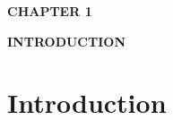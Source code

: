 \documentclass[12pt,a4paper,twoside]{report}
\begin{document}


\tableofcontents


\listoffigures


\listoftables





\clearpage
\thispagestyle{empty}

\begin{center}
    \vspace*{\fill}

    {\fontsize{16}{19}\selectfont\bfseries CHAPTER 1\par}
    \vspace{0.6cm}
    {\fontsize{16}{19}\selectfont\bfseries INTRODUCTION\par}

    \vspace*{\fill}
\end{center}

\clearpage
\clearpage
\thispagestyle{empty}
\null
\newpage
    \chapter{Introduction}
\end{document}
